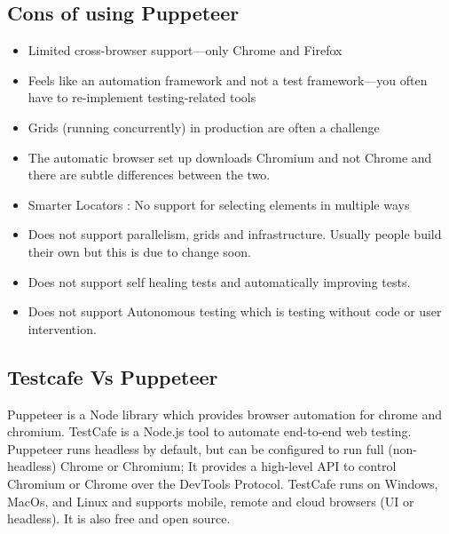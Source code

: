 \documentclass[12pt,a4paper,titlepage]{report}
\begin{document}
\subsection{Cons of using Puppeteer}
\begin{itemize}
  \item Limited cross-browser support—only Chrome and Firefox
  \item Feels like an automation framework and not a test framework—you often have to re-implement testing-related tools
  \item Grids (running concurrently) in production are often a challenge
  \item The automatic browser set up downloads Chromium and not Chrome and there are subtle differences between the two.
  \item Smarter Locators : No support for selecting elements in multiple ways
  \item Does not support parallelism, grids and infrastructure. Usually people build their own but this is due to change soon.
  \item Does not support self healing tests and automatically improving tests.
  \item Does not support Autonomous testing which is testing without code or user intervention.
\end{itemize}

\subsection{Testcafe Vs Puppeteer}

Puppeteer is a Node library which provides browser automation for chrome and chromium.
TestCafe is a Node.js tool to automate end-to-end web testing. Puppeteer runs headless by default,
but can be configured to run full (non-headless) Chrome or Chromium; It provides a high-level API to
control Chromium or Chrome over the DevTools Protocol. TestCafe runs on Windows, MacOs, and Linux and
supports mobile, remote and cloud browsers (UI or headless). It is also free and open source.

\clearpage
\end{document}
